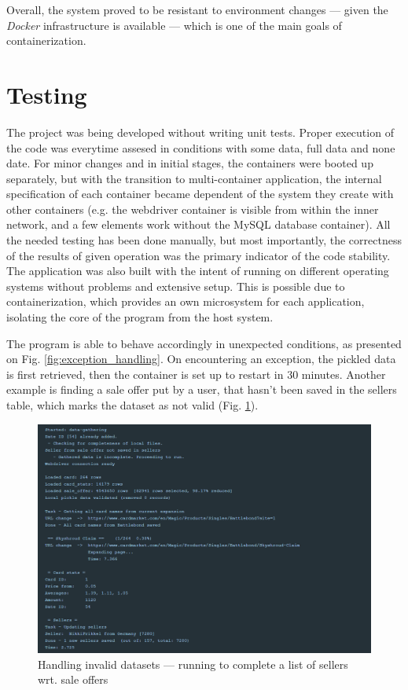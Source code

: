 Overall, the system proved to be resistant to environment changes --- given the \textit{Docker} infrastructure is available --- which is one of the main goals of containerization.

\section{Testing}
\label{s:testing}
The project was being developed without writing unit tests. Proper execution of the code was everytime assesed in conditions with some data, full data and none date. For minor changes and in initial stages, the containers were booted up separately, but with the transition to multi-container application, the internal specification of each container became dependent of the system they create with other containers (e.g. the webdriver container is visible from within the inner network, and a few elements work without the MySQL database container). All the needed testing has been done manually, but most importantly, the correctness of the results of given operation was the primary indicator of the code stability. The application was also built with the intent of running on different operating systems without problems and extensive setup. This is possible due to containerization, which provides an own microsystem for each application, isolating the core of the program from the host system. \par
The program is able to behave accordingly in unexpected conditions, as presented on Fig. \ref{fig:exception_handling}. On encountering an exception, the pickled data is first retrieved, then the container is set up to restart in 30 minutes. Another example is finding a sale offer put by a user, that hasn't been saved in the sellers table, which marks the dataset as not valid (Fig. \ref{fig:unknown_seller}).

\begin{figure}
    \centering
    \includegraphics[width=\textwidth]{figures/unknown_seller.png}
    \caption{Handling invalid datasets --- running to complete a list of sellers wrt. sale offers}
    \label{fig:unknown_seller}
\end{figure}


